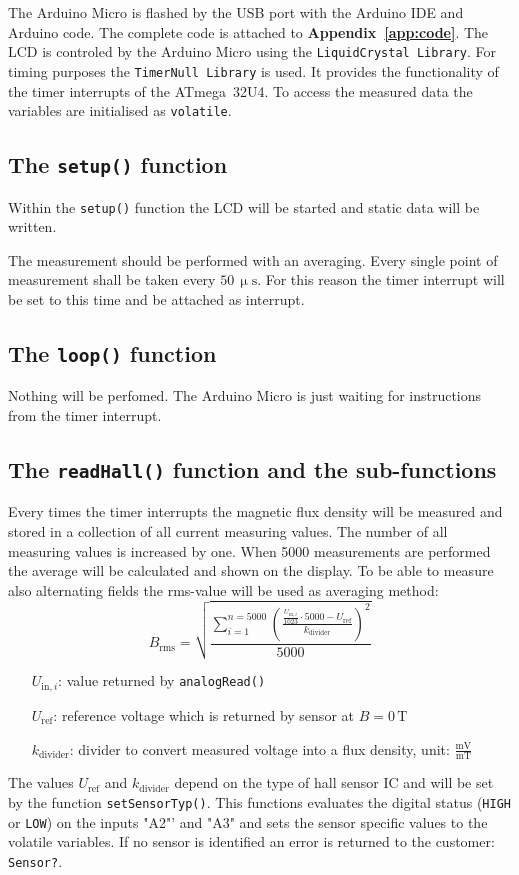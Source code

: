 \documentclass[twoside,accentcolor=tud2a,nochapname,11pt]{tudexercise}
\begin{document}
The Arduino Micro is flashed by the USB port with the Arduino IDE and Arduino code. The complete code is attached to \textbf{Appendix~\ref{app:code}}.
The LCD is controled by the Arduino Micro using the \texttt{LiquidCrystal Library}. For timing purposes the \texttt{TimerNull Library} is used. It provides the functionality of the timer interrupts of the ATmega~32U4.
To access the measured data the variables are initialised as \texttt{volatile}.

\subsection{The \texttt{setup()} function}
Within the \texttt{setup()} function the LCD will be started and static data will be written.

The measurement should be performed with an averaging. Every single point of measurement shall be taken every $50\,\upmu\mathrm{s}$. For this reason the timer interrupt will be set to this time and be attached as interrupt.

\subsection{The \texttt{loop()} function}
Nothing will be perfomed. The Arduino Micro is just waiting for instructions from the timer interrupt.

\subsection{The \texttt{readHall()} function and the sub-functions}
Every times the timer interrupts the magnetic flux density will be measured and stored in a collection of all current measuring values. The number of all measuring values is increased by one. When 5000 measurements are performed the average will be calculated and shown on the display. To be able to measure also alternating fields the rms-value will be used as averaging method:
$$B_\mathrm{rms} = \sqrt{\frac{\sum_{i=1}^{n=5000}{\left(\frac{\frac{U_{\mathrm{in},i}}{1023}\cdot 5000-U_\mathrm{ref}}{k_\mathrm{divider}}\right)^2}}{5000}}$$
\begin{itemize}
	\item[$U_{\mathrm{in},i}$:] value returned by \texttt{analogRead()}
	\item[$U_\mathrm{ref}$:] reference voltage which is returned by sensor at $B=0\,\mathrm{T}$
	\item[$k_\mathrm{divider}$:] divider to convert measured voltage into a flux density, unit: $\mathrm{\frac{mV}{mT}}$
\end{itemize}
The values $U_\mathrm{ref}$ and $k_\mathrm{divider}$ depend on the type of hall sensor IC and will be set by the function \texttt{setSensorTyp()}. This functions evaluates the digital status (\texttt{HIGH} or \texttt{LOW}) on the inputs "A2"' and "A3" and sets the sensor specific values to the volatile variables. If no sensor is identified an error is returned to the customer: \texttt{Sensor?}.
\end{document}
